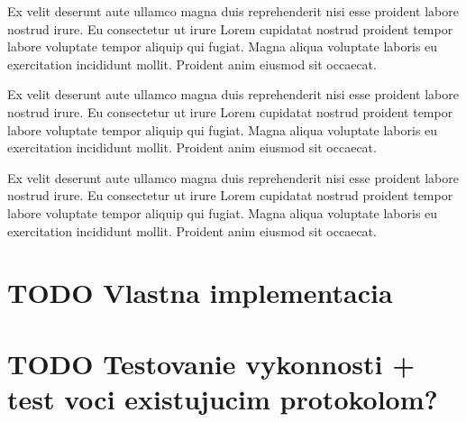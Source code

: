 \documentclass[slovak,master]{diploma}
\begin{document}
Ex velit deserunt aute ullamco magna duis reprehenderit nisi esse proident labore nostrud irure. Eu consectetur ut irure Lorem cupidatat nostrud proident tempor labore voluptate tempor aliquip qui fugiat. Magna aliqua voluptate laboris eu exercitation incididunt mollit. Proident anim eiusmod sit occaecat.

Ex velit deserunt aute ullamco magna duis reprehenderit nisi esse proident labore nostrud irure. Eu consectetur ut irure Lorem cupidatat nostrud proident tempor labore voluptate tempor aliquip qui fugiat. Magna aliqua voluptate laboris eu exercitation incididunt mollit. Proident anim eiusmod sit occaecat.

Ex velit deserunt aute ullamco magna duis reprehenderit nisi esse proident labore nostrud irure. Eu consectetur ut irure Lorem cupidatat nostrud proident tempor labore voluptate tempor aliquip qui fugiat. Magna aliqua voluptate laboris eu exercitation incididunt mollit. Proident anim eiusmod sit occaecat.



\chapter{TODO Vlastna implementacia}
\chapter{TODO Testovanie vykonnosti + test voci existujucim protokolom?}


\printbibliography[title={Literatura}, heading=bibintoc]

%
%

%
\end{document}
